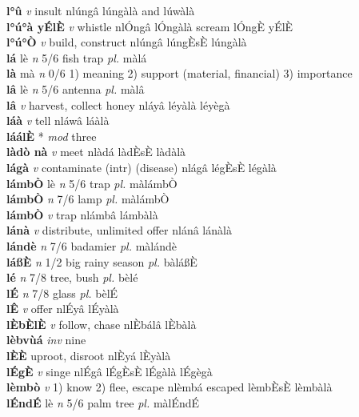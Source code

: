 \documentclass{article}
\begin{document}
{\bf l°û}  {\it v} insult   nlúngâ   lúngàlà and lúwàlà   \\ 
{\bf l°ú°à yÉlÈ}  {\it v} whistle   nlÓngâ   lÓngàlà scream  lÓngÈ yÉlÈ  \\ 
{\bf l°ú°Ò}  {\it v} build, construct   nlúngâ  lúngÈsÈ lúngàlà   \\ 
{\bf lá} lè {\it n} 5/6 fish trap {\it pl.} màlá         \\ 
{\bf là} mà {\it n} 0/6 1) meaning 2) support (material, financial) 3) importance         \\ 
{\bf lâ} lè {\it n} 5/6 antenna {\it pl.} màlâ         \\ 
{\bf lâ}  {\it v} harvest, collect honey   nláyâ   léyàlà léyègà  \\ 
{\bf láà}  {\it v} tell    nláwâ   láàlà   \\ 
{\bf láálÈ} * {\it mod} three         \\ 
{\bf làdò nà}  {\it v} meet   nlàdá  làdÈsÈ làdàlà   \\ 
{\bf lágà}  {\it v} contaminate (intr) (disease)   nlágâ  légÈsÈ légàlà   \\ 
{\bf lámbÒ} lè {\it n} 5/6 trap {\it pl.} màlámbÒ         \\ 
{\bf lámbÒ}  {\it n} 7/6 lamp {\it pl.} màlámbÒ         \\ 
{\bf lámbÒ}  {\it v} trap   nlámbâ   lámbàlà   \\ 
{\bf lánà}  {\it v} distribute, unlimited offer   nlánâ   lánàlà   \\ 
{\bf lándè}  {\it n} 7/6 badamier {\it pl.} màlándè         \\ 
{\bf láßÈ}   {\it n} 1/2 big rainy season {\it pl.} bàláßÈ         \\ 
{\bf lé}  {\it n} 7/8 tree, bush {\it pl.} bèlé         \\ 
{\bf lÉ}  {\it n} 7/8 glass {\it pl.} bèlÉ         \\ 
{\bf lÊ}  {\it v} offer   nlÉyâ   lÉyàlà   \\ 
{\bf lÈbÈlÈ}  {\it v} follow, chase   nlÈbálâ   lÈbàlà   \\ 
{\bf lèbvùá}  {\it inv} nine         \\ 
{\bf lÈÈ}  {\it } uproot, disroot   nlÈyá   lÈyàlà   \\ 
{\bf lÉgÈ}  {\it v} singe   nlÉgâ  lÉgÈsÈ lÉgàlà lÉgègà  \\ 
{\bf lèmbò}  {\it v} 1) know 2) flee, escape   nlèmbá escaped  lèmbÈsÈ lèmbàlà   \\ 
{\bf lÉndÉ} lè {\it n} 5/6 palm tree {\it pl.} màlÉndÉ         \\ 
\end{document}
